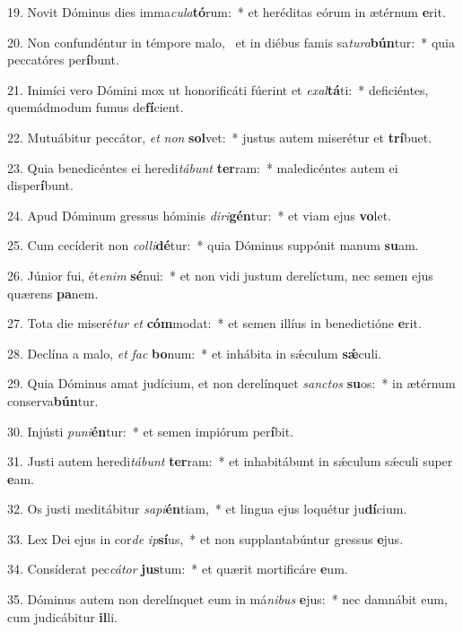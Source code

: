 19. Novit Dóminus dies imma\textit{cu}\textit{la}\textbf{tó}rum:~*  et heréditas eórum in ætérnum \textbf{e}rit.\

20. Non confundéntur in témpore malo, \dag\  et in diébus famis sa\textit{tu}\textit{ra}\textbf{bún}tur:~*  quia peccatóres per\textbf{í}bunt.\

21. Inimíci vero Dómini mox ut honorificáti fúerint et \textit{ex}\textit{al}\textbf{tá}ti:~*  deficiéntes, quemádmodum fumus de\textbf{fí}cient.\

22. Mutuábitur peccátor, \textit{et} \textit{non} \textbf{sol}vet:~*  justus autem miserétur et \textbf{trí}buet.\

23. Quia benedicéntes ei heredi\textit{tá}\textit{bunt} \textbf{ter}ram:~*  maledicéntes autem ei disper\textbf{í}bunt.\

24. Apud Dóminum gressus hóminis \textit{di}\textit{ri}\textbf{gén}tur:~*  et viam ejus \textbf{vo}let.\

25. Cum cecíderit non \textit{col}\textit{li}\textbf{dé}tur:~*  quia Dóminus suppónit manum \textbf{su}am.\

26. Júnior fui, ét\textit{e}\textit{nim} \textbf{sé}nui:~*  et non vidi justum derelíctum, nec semen ejus quærens \textbf{pa}nem.\

27. Tota die miseré\textit{tur} \textit{et} \textbf{cóm}modat:~*  et semen illíus in benedictióne \textbf{e}rit.\

28. Declína a malo, \textit{et} \textit{fac} \textbf{bo}num:~*  et inhábita in sǽculum \textbf{sǽ}culi.\

29. Quia Dóminus amat judícium, et non derelínquet \textit{sanc}\textit{tos} \textbf{su}os:~*  in ætérnum conserva\textbf{bún}tur.\

30. Injústi \textit{pu}\textit{ni}\textbf{én}tur:~*  et semen impiórum per\textbf{í}bit.\

31. Justi autem heredi\textit{tá}\textit{bunt} \textbf{ter}ram:~*  et inhabitábunt in sǽculum sǽculi super \textbf{e}am.\

32. Os justi meditábitur \textit{sa}\textit{pi}\textbf{én}tiam,~*  et lingua ejus loquétur ju\textbf{dí}cium.\

33. Lex Dei ejus in cor\textit{de} \textit{ip}\textbf{sí}us,~*  et non supplantabúntur gressus \textbf{e}jus.\

34. Consíderat pec\textit{cá}\textit{tor} \textbf{jus}tum:~*  et quærit mortificáre \textbf{e}um.\

35. Dóminus autem non derelínquet eum in má\textit{ni}\textit{bus} \textbf{e}jus:~*  nec damnábit eum, cum judicábitur \textbf{il}li.\

